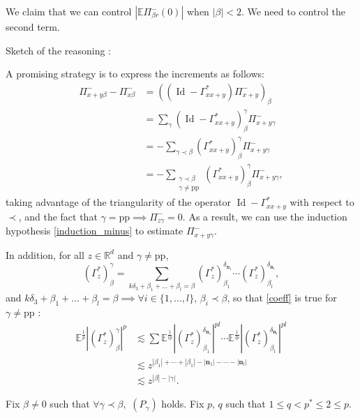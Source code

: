 \documentclass[12pt, a4paper]{article}
\newcommand{\R}{\mathbb{R}}
\newcommand{\E}{\mathbb{E}}
\newcommand{\mn}{\mathbf{n}}
\newcommand{\abs}[1]{\left| #1 \right|}
\begin{document}
We claim that we can control $\abs{\E \Pi^-_{\beta r}(0)}$  when $\abs{\beta}<2$.
We need to control the second term.




Sketch of the reasoning :

A promising strategy is to express the increments as follows:
\begin{align*}
    \Pi^-_{x+y\beta} - \Pi^-_{x\beta} &= ((\operatorname*{Id} - \Gamma_{x x+y}^*)\Pi^-_{x+y})_\beta \\
    &= \sum_{\gamma} (\operatorname*{Id} - \Gamma_{x x+y}^*)^\gamma_\beta \Pi^-_{x+y\gamma} \\
    &= - \sum_{\gamma \prec \beta} (\Gamma_{x x+y}^*)^\gamma_\beta \Pi^-_{x+y\gamma} \\
    &= - \sum_{\substack{\gamma \prec \beta \\ \gamma \neq \text{pp}}} (\Gamma_{x x+y}^*)^\gamma_\beta \Pi^-_{x+y\gamma},
\end{align*}
taking advantage of the triangularity of the operator $\operatorname*{Id} - \Gamma_{x x+y}^*$ with respect to $\prec$, and the fact that $\gamma = \text{pp}\implies \Pi^-_{z\gamma} = 0$.
As a result, we can use the induction hypothesis \eqref{induction_minus} to estimate $\Pi^-_{x+y\gamma}$.

In addition, for all $z\in \R^{d}$ and $\gamma\neq \text{pp}$,
\begin{equation}
    (\Gamma_{z}^*)_\beta^\gamma = \sum_{k\delta_3 + \beta_1 + \dots + \beta_l = \beta} (\Gamma^*_z)_{\beta_1}^{\delta_{\mn_1}}\cdots (\Gamma^*_z)_{\beta_l}^{\delta_{\mn_l}},
\end{equation}
and $k\delta_3 + \beta_1 + \dots + \beta_l = \beta \implies \forall i\in \{1,\dots,l\}, \, \beta_i \prec \beta$,
so that \eqref{coeff} is true for $\gamma\neq \text{pp}$ : 
\begin{align*}
    \E^{\frac{1}{p}} \abs{(\Gamma^*_z)^\gamma_\beta}^p &\lesssim \sum \E^{\frac{1}{lp}} \abs{(\Gamma^*_z)_{\beta_1}^{\delta_{\mn_1}}}^{pl} \cdots \E^{\frac{1}{lp}} \abs{(\Gamma^*_z)_{\beta_l}^{\delta_{\mn_l}}}^{pl} \\
    &\lesssim z^{\abs{\beta_1}+\cdots+\abs{\beta_1} - \abs{\mn_1}-\cdots - \abs{\mn_l}}\\
    &\lesssim z^{\abs{\beta}-\abs{\gamma}}.
\end{align*}







Fix $\beta \neq 0$ such that $\forall \gamma \prec \beta,$ $(P_\gamma)$ holds.
Fix $p$, $q$ such that $1\leq q < p^* \leq 2 \leq p$.
\end{document}
